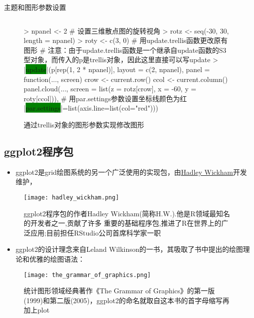\begin{frame}[t,fragile]{\subsecname}{主题和图形参数设置}
\begin{overlayarea}{\textwidth}{\textheight}
\begin{onlyenv}
\begin{figure}
\begin{columns}
    \begin{column}[c]{.6\textwidth}
\begin{rcode}
> npanel <- 2
# 设置三维散点图的旋转视角
> rotz <- seq(-30, 30, length = npanel)
> roty <- c(3, 0)
# 用update.trellis函数更改原有图形
# 注意：由于update.trellis函数是一个继承自update函数的S3型对象，而传入的p是trellis对象，因此这里直接可以写update
> |\colorbox{green}{update}|(p[rep(1, 2 * npanel)], 
         layout = c(2, npanel),
         panel = function(..., screen) {
           crow <- current.row()
           ccol <- current.column()
         panel.cloud(..., screen = list(z = rotz[crow], x = -60, y = roty[ccol]))},
         # 用par.settings参数设置坐标线颜色为红 
         |\colorbox{green}{par.settings}|=list(axis.line=list(col="red")))
\end{rcode}
    \end{column}
  \end{columns}
  \caption{通过trellis对象的图形参数实现修改图形}
\end{figure}
\end{onlyenv}
\end{overlayarea}
\end{frame}


\subsection{ggplot2程序包}
\begin{frame}[t]{\subsecname}{}
\begin{itemize}
\item ggplot2是grid绘图系统的另一个广泛使用的实现包，由\href{http://hadley.nz/}{\uline{Hadley Wickham}}开发维护， 
\end{itemize}
\begin{figure}[ht]
  \centering
  \texttt{[image: hadley\_wickham.png]}
  \caption{ggplot2程序包的作者Hadley Wickham(简称H.W.).他是R领域最知名的开发者之一,贡献了许多
重要的基础程序包,推进了R在世界上的广泛应用;目前担任RStudio公司首席科学家一职}
\end{figure}
\end{frame}

\begin{frame}[t]{\subsecname}{}
\begin{itemize}
\item ggplot2的设计理念来自Leland Wilkinson的一书，其吸取了书中提出的绘图理论和优雅的绘图语法：
\end{itemize}
\begin{figure}[ht]
  \centering
  \texttt{[image: the\_grammar\_of\_graphics.png]}
  \caption{统计图形领域经典著作《The Grammar of Graphics》的第一版(1999)和第二版(2005)，ggplot2的命名就取自这本书的首字母缩写再加上plot}
\end{figure}
\end{frame}

